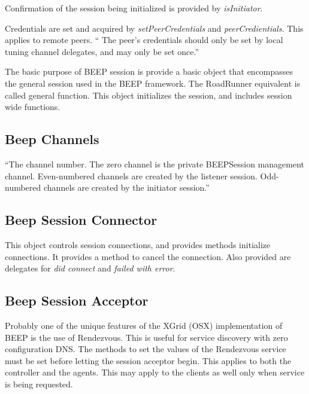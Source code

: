  Confirmation of the session being initialized is provided by \textsl{isInitiator}.    
 
 Credentials are set and acquired by \textsl{setPeerCredentials} and \textsl{peerCredientials}.  This applies to remote peers.  `` The peer's credentials should only be set by local
 tuning channel delegates, and may only be set once.''
 
 The basic purpose of BEEP session is provide a basic object that encompasses the general session used in the BEEP framework.  The RoadRunner equivalent is called general function.    This object initializes the session, and includes session wide functions.  

 
 
\subsection {Beep Channels}

``The channel number.  The zero channel is the private BEEPSession management channel.  Even-numbered
 channels are created by the listener session.  Odd-numbered channels are created by the initiator session.'' \cite{OSXgridAPI}   
 
 
 \subsection {Beep Session Connector } 
 This object controls session connections, and provides methods initialize connections.  It provides a method to cancel the connection.  Also provided are delegates for \textsl{did connect} and \textsl{failed with error}.  
 
 
 \subsection {Beep Session Acceptor}
 Probably one of the unique features of the XGrid (OSX) implementation of BEEP is the use of Rendezvous.  This is useful for service discovery with zero configuration DNS.    The methods to set the values of the Rendezvous service must be set before letting the session acceptor begin.  This applies to both the controller and the agents.   This may apply to the clients as well only when service is being requested.  


